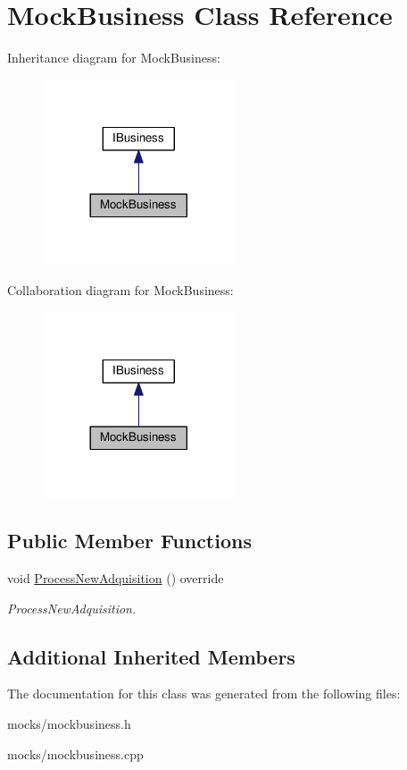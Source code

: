 \hypertarget{class_mock_business}{}\section{Mock\+Business Class Reference}
\label{class_mock_business}


Inheritance diagram for Mock\+Business\+:
\nopagebreak
\begin{figure}[H]
\begin{center}
\leavevmode
\includegraphics[width=161pt]{class_mock_business__inherit__graph}
\end{center}
\end{figure}


Collaboration diagram for Mock\+Business\+:
\nopagebreak
\begin{figure}[H]
\begin{center}
\leavevmode
\includegraphics[width=161pt]{class_mock_business__coll__graph}
\end{center}
\end{figure}
\subsection*{Public Member Functions}
\begin{DoxyCompactItemize}
\item 
void \hyperlink{class_mock_business_ad9d35921a0b2ed09268197273d9c10f3}{Process\+New\+Adquisition} () override\hypertarget{class_mock_business_ad9d35921a0b2ed09268197273d9c10f3}{}\label{class_mock_business_ad9d35921a0b2ed09268197273d9c10f3}

\begin{DoxyCompactList}\small\item\em Process\+New\+Adquisition. \end{DoxyCompactList}\end{DoxyCompactItemize}
\subsection*{Additional Inherited Members}


The documentation for this class was generated from the following files\+:\begin{DoxyCompactItemize}
\item 
mocks/mockbusiness.\+h\item 
mocks/mockbusiness.\+cpp\end{DoxyCompactItemize}
